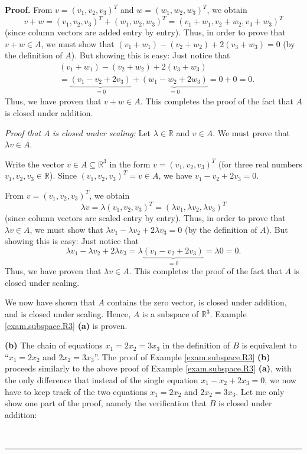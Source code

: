 \documentclass[numbers=enddot,12pt,final,onecolumn,notitlepage]{scrartcl}%
\theoremstyle{definition}
\newenvironment{proof}[1][Proof]{\noindent\textbf{#1.} }{\ \rule{0.5em}{0.5em}}
\begin{document}
\begin{proof}
From $v=\left(  v_{1},v_{2},v_{3}\right)  ^{T}$ and $w=\left(  w_{1}%
,w_{2},w_{3}\right)  ^{T}$, we obtain%
\[
v+w=\left(  v_{1},v_{2},v_{3}\right)  ^{T}+\left(  w_{1},w_{2},w_{3}\right)
^{T}=\left(  v_{1}+w_{1},v_{2}+w_{2},v_{3}+w_{3}\right)  ^{T}%
\]
(since column vectors are added entry by entry). Thus, in order to prove that
$v+w\in A$, we must show that $\left(  v_{1}+w_{1}\right)  -\left(
v_{2}+w_{2}\right)  +2\left(  v_{3}+w_{3}\right)  =0$ (by the definition of
$A$). But showing this is easy: Just notice that%
\begin{align*}
&  \left(  v_{1}+w_{1}\right)  -\left(  v_{2}+w_{2}\right)  +2\left(
v_{3}+w_{3}\right) \\
&  =\underbrace{\left(  v_{1}-v_{2}+2v_{3}\right)  }_{=0}+\underbrace{\left(
w_{1}-w_{2}+2w_{3}\right)  }_{=0}=0+0=0.
\end{align*}
Thus, we have proven that $v+w\in A$. This completes the proof of the fact
that $A$ is closed under addition.

\textit{Proof that }$A$ \textit{is closed under scaling:} Let $\lambda
\in\mathbb{R}$ and $v\in A$. We must prove that $\lambda v\in A$.

Write the vector $v\in A\subseteq\mathbb{R}^{3}$ in the form $v=\left(
v_{1},v_{2},v_{3}\right)  ^{T}$ (for three real numbers $v_{1},v_{2},v_{3}%
\in\mathbb{R}$). Since $\left(  v_{1},v_{2},v_{3}\right)  ^{T}=v\in A$, we
have $v_{1}-v_{2}+2v_{3}=0$.

From $v=\left(  v_{1},v_{2},v_{3}\right)  ^{T}$, we obtain%
\[
\lambda v=\lambda\left(  v_{1},v_{2},v_{3}\right)  ^{T}=\left(  \lambda
v_{1},\lambda v_{2},\lambda v_{3}\right)  ^{T}%
\]
(since column vectors are scaled entry by entry). Thus, in order to prove that
$\lambda v\in A$, we must show that $\lambda v_{1}-\lambda v_{2}+2\lambda
v_{3}=0$ (by the definition of $A$). But showing this is easy: Just notice
that%
\[
\lambda v_{1}-\lambda v_{2}+2\lambda v_{3}=\lambda\underbrace{\left(
v_{1}-v_{2}+2v_{3}\right)  }_{=0}=\lambda0=0.
\]
Thus, we have proven that $\lambda v\in A$. This completes the proof of the
fact that $A$ is closed under scaling.

We now have shown that $A$ contains the zero vector, is closed under addition,
and is closed under scaling. Hence, $A$ is a subspace of $\mathbb{R}^{3}$.
Example \ref{exam.subspace.R3} \textbf{(a)} is proven.

\textbf{(b)} The chain of equations $x_{1}=2x_{2}=3x_{3}$ in the definition of
$B$ is equivalent to \textquotedblleft$x_{1}=2x_{2}$ and $2x_{2}=3x_{3}%
$\textquotedblright. The proof of Example \ref{exam.subspace.R3} \textbf{(b)}
proceeds similarly to the above proof of Example \ref{exam.subspace.R3}
\textbf{(a)}, with the only difference that instead of the single equation
$x_{1}-x_{2}+2x_{3}=0$, we now have to keep track of the two equations
$x_{1}=2x_{2}$ and $2x_{2}=3x_{3}$. Let me only show one part of the proof,
namely the verification that $B$ is closed under addition:


\end{proof}
\end{document}

